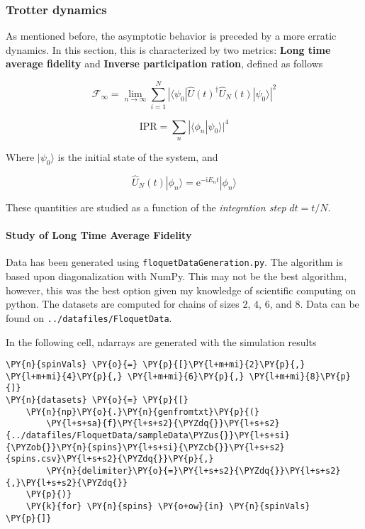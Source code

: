     
    \hypertarget{trotter-dynamics}{%
\subsubsection{Trotter dynamics}\label{trotter-dynamics}}

As mentioned before, the asymptotic behavior is preceded by a more
erratic dynamics. In this section, this is characterized by two metrics:
\textbf{Long time average fidelity} and \textbf{Inverse participation
ration}, defined as follows

\[
\mathcal{F}_{\infty} = \lim_{n \rightarrow \infty} \sum_{i = 1}^N |\langle\psi_0|\hat{U}(t)^\dagger\hat{U}_N(t)|\psi_0\rangle|^2
\]

\[
\text{IPR} = \sum_{n} |\langle\phi_n|\psi_0\rangle|^4
\]

Where \(|\psi_0\rangle\) is the initial state of the system, and

\[
\hat{U}_N(t)|\phi_n\rangle = \mathrm{e}^{-\mathrm{i}E_n t}|\phi_n\rangle
\]

These quantities are studied as a function of the \emph{integration
step} \(dt = t/N\).

    \hypertarget{study-of-long-time-average-fidelity}{%
\paragraph{Study of Long Time Average
Fidelity}\label{study-of-long-time-average-fidelity}}

Data has been generated using \texttt{floquetDataGeneration.py}. The
algorithm is based upon diagonalization with NumPy. This may not be the
best algorithm, however, this was the best option given my knowledge of
scientific computing on python. The datasets are computed for chains of
sizes \(2\), \(4\), \(6\), and \(8\). Data can be found on
\texttt{../datafiles/FloquetData}.

In the following cell, ndarrays are generated with the simulation
results

    \begin{tcolorbox}[breakable, size=fbox, boxrule=1pt, pad at break*=1mm,colback=cellbackground, colframe=cellborder]
\begin{Verbatim}[commandchars=\\\{\}]
\PY{n}{spinVals} \PY{o}{=} \PY{p}{[}\PY{l+m+mi}{2}\PY{p}{,} \PY{l+m+mi}{4}\PY{p}{,} \PY{l+m+mi}{6}\PY{p}{,} \PY{l+m+mi}{8}\PY{p}{]}
\PY{n}{datasets} \PY{o}{=} \PY{p}{[}
    \PY{n}{np}\PY{o}{.}\PY{n}{genfromtxt}\PY{p}{(}
        \PY{l+s+sa}{f}\PY{l+s+s2}{\PYZdq{}}\PY{l+s+s2}{../datafiles/FloquetData/sampleData\PYZus{}}\PY{l+s+si}{\PYZob{}}\PY{n}{spins}\PY{l+s+si}{\PYZcb{}}\PY{l+s+s2}{spins.csv}\PY{l+s+s2}{\PYZdq{}}\PY{p}{,}
        \PY{n}{delimiter}\PY{o}{=}\PY{l+s+s2}{\PYZdq{}}\PY{l+s+s2}{,}\PY{l+s+s2}{\PYZdq{}}
    \PY{p}{)}
    \PY{k}{for} \PY{n}{spins} \PY{o+ow}{in} \PY{n}{spinVals}
\PY{p}{]}
\end{Verbatim}
\end{tcolorbox}

